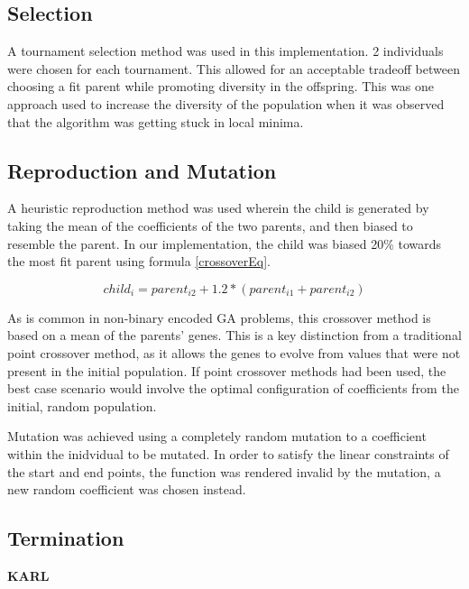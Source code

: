 \subsection{Selection}
A tournament selection method was used in this implementation. 2 individuals were chosen for each tournament. This allowed for an acceptable tradeoff between choosing a fit parent while promoting diversity in the offspring. This was one approach used to increase the diversity of the population when it was observed that the algorithm was getting stuck in local minima.

\subsection{Reproduction and Mutation}
A heuristic reproduction method was used wherein the child is generated by taking the mean of the coefficients of the two parents, and then biased to resemble the parent. In our implementation, the child was biased 20\% towards the most fit parent using formula \ref{crossoverEq}.

\begin{equation} \label{crossoverEq}
child_i = parent_{i2} + 1.2 * (parent_{i1} + parent_{i2})
\end{equation}

As is common in non-binary encoded GA problems, this crossover method is based on a mean of the parents' genes. This is a key distinction from a traditional point crossover method, as it allows the genes to evolve from values that were not present in the initial population. If point crossover methods had been used, the best case scenario would involve the optimal configuration of coefficients from the initial, random population.

Mutation was achieved using a completely random mutation to a coefficient within the inidvidual to be mutated. In order to satisfy the linear constraints of the start and end points, the function was rendered invalid by the mutation, a new random coefficient was chosen instead.

\subsection{Termination}
\textbf{KARL}

\lipsum[1]
